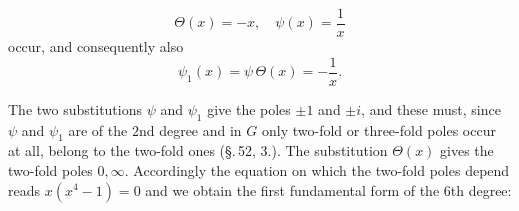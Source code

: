\[
\Theta(x) = -x, \quad \psi(x) = \frac{1}{x}
\]
occur, and consequently also
\[
\psi_1(x) = \psi\,\Theta(x) = -\frac{1}{x}.
\]

The two substitutions $\psi$ and $\psi_1$ give the poles $\pm 1$
and $\pm i$, and these must, since $\psi$ and $\psi_1$ are of the $2$nd degree
and in $G$ only two-fold or three-fold poles occur at all,
belong to the two-fold ones (\S.\,52, 3.). The substitution $\Theta(x)$
gives the two-fold poles $0, \infty$. Accordingly the equation
on which the two-fold poles depend reads $x(x^4-1) = 0$ and we
obtain the first fundamental form of the $6$th degree:
